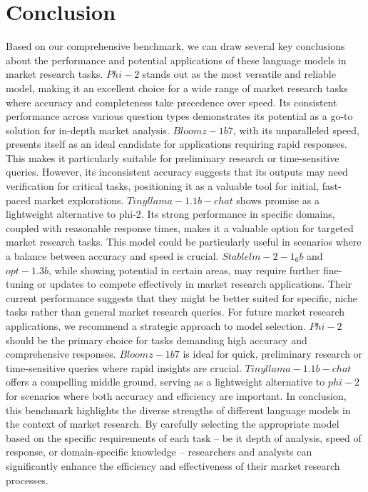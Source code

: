 \documentclass[12pt,a4paper]{article}
\begin{document}
	\section{Conclusion}
	Based on our comprehensive benchmark, we can draw several key conclusions about the performance and potential applications of these language models in market research tasks.
	$Phi-2$ stands out as the most versatile and reliable model, making it an excellent choice for a wide range of market research tasks where accuracy and completeness take precedence over speed. Its consistent performance across various question types demonstrates its potential as a go-to solution for in-depth market analysis.
	$Bloomz-1b7$, with its unparalleled speed, presents itself as an ideal candidate for applications requiring rapid responses. This makes it particularly suitable for preliminary research or time-sensitive queries. However, its inconsistent accuracy suggests that its outputs may need verification for critical tasks, positioning it as a valuable tool for initial, fast-paced market explorations.
	$Tinyllama-1.1b-chat$ shows promise as a lightweight alternative to phi-2. Its strong performance in specific domains, coupled with reasonable response times, makes it a valuable option for targeted market research tasks. This model could be particularly useful in scenarios where a balance between accuracy and speed is crucial.
	$Stablelm-2-1_6b$ and $opt-1.3b$, while showing potential in certain areas, may require further fine-tuning or updates to compete effectively in market research applications. Their current performance suggests that they might be better suited for specific, niche tasks rather than general market research queries.
	For future market research applications, we recommend a strategic approach to model selection. $Phi-2$ should be the primary choice for tasks demanding high accuracy and comprehensive responses. $Bloomz-1b7$ is ideal for quick, preliminary research or time-sensitive queries where rapid insights are crucial. $Tinyllama-1.1b-chat$ offers a compelling middle ground, serving as a lightweight alternative to $phi-2$ for scenarios where both accuracy and efficiency are important.
	In conclusion, this benchmark highlights the diverse strengths of different language models in the context of market research. By carefully selecting the appropriate model based on the specific requirements of each task – be it depth of analysis, speed of response, or domain-specific knowledge – researchers and analysts can significantly enhance the efficiency and effectiveness of their market research processes.
	
	
	
	
\end{document}
